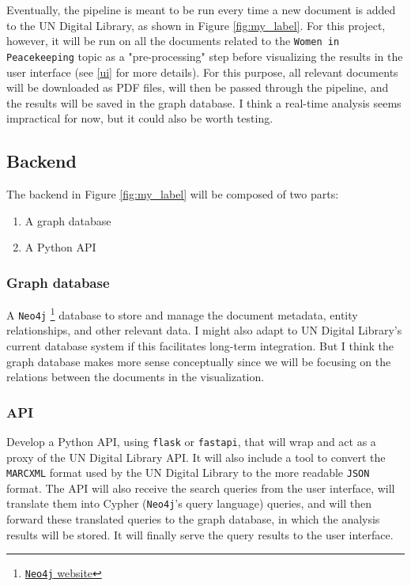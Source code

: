 \documentclass[11pt]{article}
\begin{document}
Eventually, the pipeline is meant to be run every time a new document is added to the UN Digital Library, as shown in Figure \ref{fig:my_label}. For this project, however, it will be run on all the documents related to the \texttt{Women in Peacekeeping} topic as a "pre-processing" step before visualizing the results in the user interface (see \ref{ui} for more details). For this purpose, all relevant documents will be downloaded as PDF files, will then be passed through the pipeline, and the results will be saved in the graph database. I think a real-time analysis seems impractical for now, but it could also be worth testing.

\subsection{Backend} \label{backend}

The backend in Figure \ref{fig:my_label} will be composed of two parts:

\begin{enumerate}
    \item A graph database
    \item A Python API
\end{enumerate}

\subsubsection{Graph database}
    A \texttt{Neo4j} \footnote{\href{https://neo4j.com/}{\texttt{Neo4j} website}} database to store and manage the document metadata, entity relationships, and other relevant data. I might also adapt to UN Digital Library's current database system if this facilitates long-term integration. But I think the graph database makes more sense conceptually since we will be focusing on the relations between the documents in the visualization.
    
\subsubsection{API}

Develop a Python API, using \texttt{flask} or \texttt{fastapi}, that will wrap and act as a proxy of the UN Digital Library API. It will also include a tool to convert the \texttt{MARCXML} format used by the UN Digital Library to the more readable \texttt{JSON} format. The API will also receive the search queries from the user interface, will translate them into Cypher (\texttt{Neo4j}'s query language) queries, and will then forward these translated queries to the graph database, in which the analysis results will be stored. It will finally serve the query results to the user interface.
\end{document}
